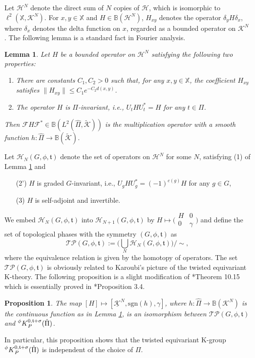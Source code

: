 \documentclass[11pt]{amsart}
\theoremstyle{definition}
\theoremstyle{plain}
\newtheorem{prp}[equation]{Proposition}
\newtheorem{lem}[equation]{Lemma}
\theoremstyle{remark}
\newcommand{\bB}{\mathbb{B}}
\newcommand{\bX}{\mathbb{X}}
\newcommand{\cF}{\mathcal{F}}
\newcommand{\cH}{\mathcal{H}}
\newcommand{\ft}{\mathfrak{t}}
\newcommand{\sH}{\mathscr{H}}
\newcommand{\sK}{\mathscr{K}}
\begin{document}
Let $\sH^N$ denote the direct sum of $N$ copies of $\sH$, which is isomorphic to $\ell^2(\bX,\sK^N)$. 
For $x,y \in \bX$ and $H \in \bB(\sH^N)$, $H_{xy}$ denotes the operator $\delta_y  H \delta_x$, where $\delta_x$ denotes the delta function on $x$, regarded as a bounded operator on $\sK^N$. The following lemma is a standard fact in Fourier analysis.
\begin{lem}\label{lem:TP}
Let $H$ be a bounded operator on $\sH^N$ satisfying the following two properties:
\begin{enumerate}
\item There are constants $C_1, C_2>0$ such that, for any $x,y \in \bX$, the coefficient $H_{xy}$ satisfies $\|H_{xy} \| \leq C_1e^{-C_2d(x,y)}$. 
\item The operator $H$ is $\Pi$-invariant, i.e., $U_t H U_t^*=H$ for any $t \in \Pi$.
\end{enumerate}
Then $\cF H \cF^* \in \bB(L^2(\hat{\Pi} , \tilde{\sK}))$ is the multiplication operator with a smooth function $h \colon \hat{\Pi} \to \bB(\tilde{\sK})$. 
\end{lem}

Let $\cH_N(G,\phi,\ft)$ denote the set of operators on $\sH^N$ for some $N$, satisfying (1) of Lemma \ref{lem:TP} and 
\begin{enumerate}
    \item[(2')] $H$ is graded $G$-invariant, i.e., $U_g H U_g^*=(-1)^{c(g)}H$ for any $g \in G$,
    \item[(3)] $H$ is self-adjoint and invertible.
\end{enumerate}
We embed $\cH_N(G,\phi,\ft)$ into $\cH_{N+1}(G,\phi,\ft)$ by $H \mapsto \big( \begin{smallmatrix} H & 0 \\ 0 & \gamma \end{smallmatrix} \big)$ and define the set of topological phases with the symmetry $(G,\phi,\ft)$ as
\[ \mathscr{TP}(G,\phi,\ft) := \Big( \bigcup_{N} \cH_N (G,\phi,\ft)\Big) /\sim, \]
where the equivalence relation is given by the homotopy of operators. 
The set $\mathscr{TP}(G,\phi,\ft)$ is obviously related to Karoubi's picture of the twisted equivariant K-theory.   
The following proposition is a slight modification of \cite{freedTwistedEquivariantMatter2013}*{Theorem 10.15} which is essentially proved in \cite{kubotaControlledTopologicalPhases2017}*{Proposition 3.4}. 
\begin{prp} \label{prp:TP}
The map $[H] \mapsto [\underline{\sK}^N , \mathrm{sgn}(h) , \gamma]$, where $h \colon \hat{\Pi} \to \bB(\sK^N)$ is the continuous function as in Lemma \ref{lem:TP}, is an isomorphism between $\mathscr{TP}(G,\phi,\ft)$ and $\prescript{\phi}{} K^{0,\ft+\sigma}_P(\hat{\Pi})$. 
\end{prp}
In particular, this proposition shows that the twisted equivariant K-group $\prescript{\phi}{} K^{0,\ft+\sigma}_P(\hat{\Pi})$ is independent of the choice of $\Pi$.
\end{document}
